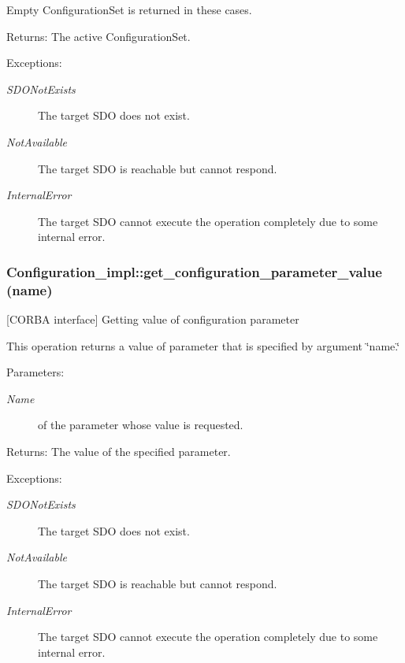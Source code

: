 Empty Configuration\-Set is returned in these cases.

\begin{Desc}
\item[Returns:]The active Configuration\-Set. \end{Desc}
\begin{Desc}
\item[Exceptions:]
\begin{description}
\item[{\em SDONot\-Exists}]The target SDO does not exist. \item[{\em Not\-Available}]The target SDO is reachable but cannot respond. \item[{\em Internal\-Error}]The target SDO cannot execute the operation completely due to some internal error.\end{description}
\end{Desc}
\subsubsection{\setlength{\rightskip}{0pt plus 5cm}Configuration\_\-impl::get\_\-configuration\_\-parameter\_\-value (name)}\label{classConfiguration__impl_Configuration__impla8}


[CORBA interface] Getting value of configuration parameter 

This operation returns a value of parameter that is specified by argument \char`\"{}name.\char`\"{}

\begin{Desc}
\item[Parameters:]
\begin{description}
\item[{\em Name}]of the parameter whose value is requested. \end{description}
\end{Desc}
\begin{Desc}
\item[Returns:]The value of the specified parameter. \end{Desc}
\begin{Desc}
\item[Exceptions:]
\begin{description}
\item[{\em SDONot\-Exists}]The target SDO does not exist. \item[{\em Not\-Available}]The target SDO is reachable but cannot respond. \item[{\em Internal\-Error}]The target SDO cannot execute the operation completely due to some internal error.\end{description}
\end{Desc}
